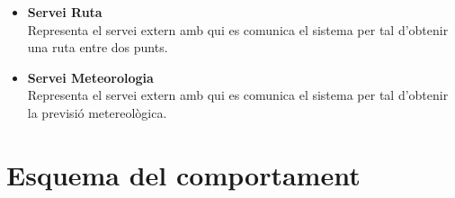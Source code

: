 \begin{itemize}
\item[]\textbf{Servei Ruta}\\
Representa el servei extern amb qui es comunica el sistema per tal d'obtenir una ruta entre dos punts.

\item[]\textbf{Servei Meteorologia}\\
Representa el servei extern amb qui es comunica el sistema per tal d'obtenir la previsió metereològica.



\end{itemize}

\section{Esquema del comportament}


